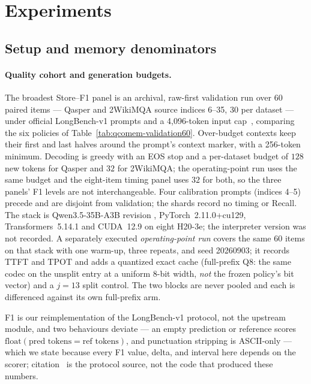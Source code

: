 \documentclass{article}
\begin{document}
\section{Experiments}
\label{sec:experiments}
\label{sec:protocol}

\subsection{Setup and memory denominators}
\label{sec:setup}

\paragraph{Quality cohort and generation budgets.}
The broadest Store--F1 panel is an archival, raw-first validation run over 60
paired items --- Qasper and 2WikiMQA source indices 6--35, 30 per dataset ---
under official LongBench-v1 prompts and a 4,096-token input
cap~\citep{bai2024longbench,dasigi2021qasper,ho2020multihopqa}, comparing the
six policies of Table~\ref{tab:qcomem-validation60}.  Over-budget contexts keep
their first and last halves around the prompt's context marker, with a 256-token
minimum.  Decoding is greedy with an EOS stop and a per-dataset budget of $128$
new tokens for Qasper and $32$ for 2WikiMQA; the operating-point run uses the
same budget and the eight-item timing panel uses $32$ for both, so the three
panels' F1 levels are not interchangeable.  Four calibration prompts (indices
4--5) precede and are disjoint from validation; the shards record no timing or
Recall.  The stack is Qwen3.5-35B-A3B revision ,
PyTorch~2.11.0+cu129, Transformers~5.14.1 and CUDA~12.9 on eight H20-3e; the
interpreter version was not recorded.  A separately executed
\emph{operating-point run} covers the same 60 items on that stack with one
warm-up, three repeats, and seed 20260903; it records TTFT and TPOT and adds a
quantized exact cache (full-prefix Q8: the same codec on the unsplit entry at a
uniform 8-bit width, \emph{not} the frozen policy's bit vector) and a $j=13$
split control.  The two blocks are never pooled and each is differenced against
its own full-prefix arm.

F1 is our reimplementation of the LongBench-v1  protocol, not
the upstream module, and two behaviours deviate --- an empty prediction or
reference scores $\mathrm{float}(\text{pred tokens}=\text{ref tokens})$, and
punctuation stripping is ASCII-only --- which we state because every F1 value,
delta, and interval here depends on the scorer;
citation~\citep{bai2024longbenchcode} is the protocol source, not the code that
produced these numbers.
\end{document}
